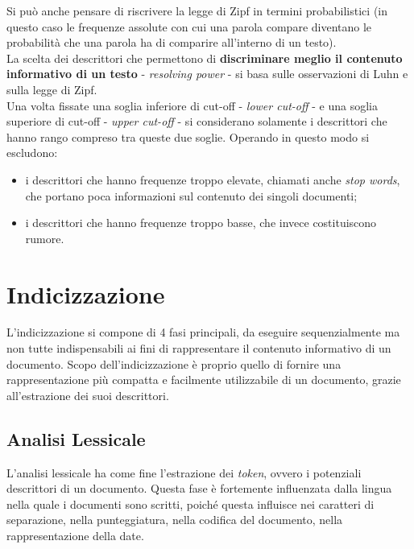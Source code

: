 \documentclass{article}
\begin{document}
Si può anche pensare di riscrivere la legge di Zipf in termini probabilistici (in questo caso le frequenze assolute con cui una parola compare diventano le probabilità che una parola ha di comparire all'interno di un testo).\\
La scelta dei descrittori che permettono di \textbf{discriminare meglio il contenuto informativo di un testo} - \textit{resolving power} - si basa sulle osservazioni di Luhn e sulla legge di Zipf.\\
Una volta fissate una soglia inferiore di cut-off - \textit{lower cut-off} - e una soglia superiore di cut-off - \textit{upper cut-off} - si considerano solamente i descrittori che hanno rango compreso tra queste due soglie.
Operando in questo modo si escludono:
\begin{itemize}
\item i descrittori che hanno frequenze troppo elevate, chiamati anche \textit{stop words}, che portano poca informazioni sul contenuto dei singoli documenti;
\item i descrittori che hanno frequenze troppo basse, che invece costituiscono rumore.
\end{itemize}


\section{Indicizzazione}
L'indicizzazione si compone di 4 fasi principali, da eseguire sequenzialmente ma non tutte indispensabili ai fini di rappresentare il contenuto informativo di un documento. Scopo dell'indicizzazione è proprio quello di fornire una rappresentazione più compatta e facilmente utilizzabile di un documento, grazie all'estrazione dei suoi descrittori.

\subsection{Analisi Lessicale}
L'analisi lessicale ha come fine l'estrazione dei \textit{token}, ovvero i potenziali descrittori di un documento. Questa fase è fortemente influenzata dalla lingua nella quale i documenti sono scritti, poiché questa influisce nei caratteri di separazione, nella punteggiatura, nella codifica del documento, nella rappresentazione della date.
\end{document}
